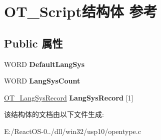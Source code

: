 \hypertarget{struct_o_t___script}{}\section{O\+T\+\_\+\+Script结构体 参考}
\label{struct_o_t___script}
\subsection*{Public 属性}
\begin{DoxyCompactItemize}
\item 
\mbox{\label{struct_o_t___script_a0cbf63ea2e5564b232c3220116922395}} 
W\+O\+RD {\bfseries Default\+Lang\+Sys}
\item 
\mbox{\label{struct_o_t___script_aa7ee31dddc9bfa9ab6045f22b6409b39}} 
W\+O\+RD {\bfseries Lang\+Sys\+Count}
\item 
\mbox{\label{struct_o_t___script_ae8e298b3fbde57c8f6d7c406fa06b116}} 
\hyperlink{struct_o_t___lang_sys_record}{O\+T\+\_\+\+Lang\+Sys\+Record} {\bfseries Lang\+Sys\+Record} \mbox{[}1\mbox{]}
\end{DoxyCompactItemize}


该结构体的文档由以下文件生成\+:\begin{DoxyCompactItemize}
\item 
E\+:/\+React\+O\+S-\/0../dll/win32/usp10/opentype.\+c\end{DoxyCompactItemize}
